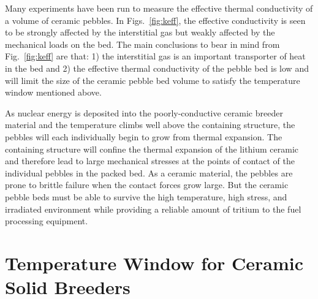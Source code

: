 Many experiments have been run to measure the effective thermal conductivity of a volume of ceramic pebbles. In Figs.~\ref{fig:keff}, the effective conductivity is seen to be strongly affected by the interstitial gas but weakly affected by the mechanical loads on the bed. The main conclusions to bear in mind from Fig.~\ref{fig:keff} are that: 1) the interstitial gas is an important transporter of heat in the bed and 2) the effective thermal conductivity of the pebble bed is low and will limit the size of the ceramic pebble bed volume to satisfy the temperature window mentioned above.


As nuclear energy is deposited into the poorly-conductive ceramic breeder material and the temperature climbs well above the containing structure, the pebbles will each individually begin to grow from thermal expansion. The containing structure will confine the thermal expansion of the lithium ceramic and therefore lead to large mechanical stresses at the points of contact of the individual pebbles in the packed bed. As a ceramic material, the pebbles are prone to brittle failure when the contact forces grow large. But the ceramic pebble beds must be able to survive the high temperature, high stress, and irradiated environment while providing a reliable amount of tritium to the fuel processing equipment.

\section{Temperature Window for Ceramic Solid Breeders}




